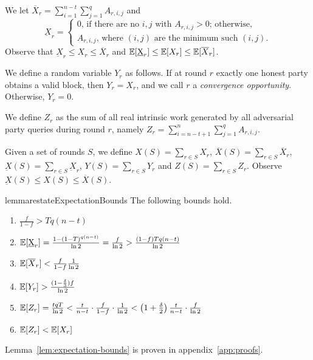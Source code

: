 We let $\overline{X}_r = \sum_{i = 1}^{n - t} \sum_{j = 1}^q A_{r,i,j}$ and
\[
  \underbar{X}_r = \begin{cases}
  0 \text{, if there are no $i, j$ with $A_{r,i,j} > 0$; otherwise,}\\
  A_{r,i,j} \text{, where $(i, j)$ are the minimum such $(i, j)$.}
\end{cases}\]
Observe that $\underbar{X}_r \leq X_r \leq \overline{X}_r$
and $\mathop{{}\mathbb{E}}[\underbar{X}_r] \leq \mathop{{}\mathbb{E}}[X_r] \leq \mathop{{}\mathbb{E}}[\overline{X}_r]$.

We define a random variable $Y_r$ as follows.
If at round $r$ exactly one honest party obtains a valid block, then $Y_r = X_r$,
and we call $r$ a \emph{convergence opportunity}. Otherwise, $Y_r = 0$.

We define $Z_{r}$ as the sum of all real intrinsic work generated by all adversarial
party queries during round $r$, namely $Z_{r} = \sum_{i = n - t + 1}^n \sum_{j = 1}^q A_{r, i, j}$.

Given a set of rounds $S$, we define
$X(S) = \sum_{r \in S} X_r$,
$\overline{X}(S) = \sum_{r \in S} \overline{X}_r$,
$\underbar{X}(S) = \sum_{r \in S} \underbar{X}_r$,
$Y(S) = \sum_{r \in S} Y_r$
and $Z(S) = \sum_{r \in S} Z_r$.
Observe $\underbar{X}(S) \leq X(S) \leq \overline{X}(S)$.

\begin{restatable}{lemma}{restateExpectationBounds}\label{lem:expectation-bounds}
  The following bounds hold.
  \begin{enumerate}
    \item $\frac{f}{1 - f} > Tq(n - t)$
    \item $\mathop{{}\mathbb{E}}[\underbar{X}_r] = \frac{1 - (1 - T)^{q(n - t)}}{\ln2} = \frac{f}{\ln2}
            > \frac{(1 - f)Tq(n - t)}{\ln2}$ \label{eq.ex-underbar-x-bound}
    \item $\mathop{{}\mathbb{E}}[\overline{X}_r] < \frac{f}{1 - f}\frac{1}{\ln2}$
    \item $\mathop{{}\mathbb{E}}[Y_r] > \frac{(1 - \frac{\delta}{3})f}{\ln2}$\label{eq.ex-y-bound}
    \item $\mathop{{}\mathbb{E}}[Z_r] = \frac{tqT}{\ln2} < \frac{t}{n - t} \cdot \frac{f}{1 - f} \cdot \frac{1}{\ln2}  < \left(1 + \frac{\delta}{2}\right)\frac{t}{n - t} \cdot \frac{f}{\ln2}$\label{eq.ex-z-bound}
    \item $\mathop{{}\mathbb{E}}[Z_r] < \mathop{{}\mathbb{E}}[X_r]$
  \end{enumerate}
\end{restatable}

Lemma~\ref{lem:expectation-bounds} is proven in appendix~\ref{app:proofs}.

